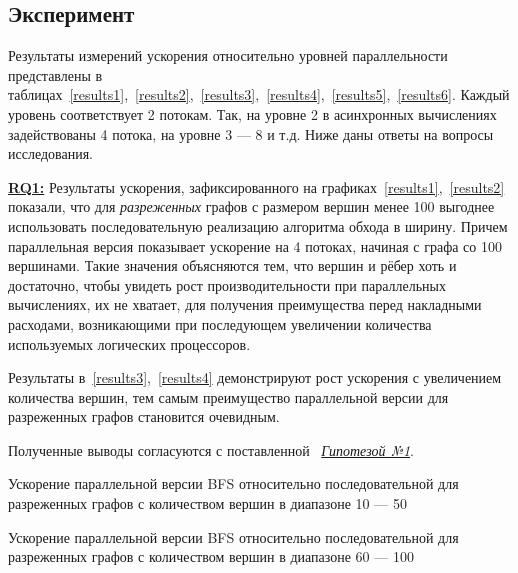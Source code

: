 \subsection{Эксперимент}
Результаты измерений ускорения относительно уровней параллельности представлены в таблицах~\ref{results1},~\ref{results2},~\ref{results3},~\ref{results4},~\ref{results5},~\ref{results6}. Каждый уровень соответствует 2 потокам. Так, на уровне 2 в асинхронных вычислениях задействованы 4 потока, на уровне 3 --- 8 и т.д. 
Ниже даны ответы на вопросы исследования.
\newline

\hyperref[rq1]{\textbf{RQ1:}}
Результаты ускорения, зафиксированного на графиках~\ref{results1},~\ref{results2} показали, что для \emph{разреженных} графов с размером вершин менее 100 выгоднее использовать последовательную реализацию алгоритма обхода в ширину. Причем параллельная версия показывает ускорение на 4 потоках, начиная с графа со 100 вершинами. Такие значения объясняются тем, что вершин и рёбер хоть и достаточно, чтобы увидеть рост производительности при параллельных вычислениях, их не хватает, для получения преимущества перед накладными расходами, возникающими при последующем увеличении количества используемых логических процессоров. 

Результаты в~\ref{results3},~\ref{results4} демонстрируют рост ускорения с увеличением количества вершин, тем самым преимущество параллельной версии для разреженных графов становится очевидным.

Полученные выводы согласуются с поставленной ~\hyperref[t1]{\textit{Гипотезой №1}}.
\newline

\begin{table}
  \centering

\caption{Ускорение параллельной версии BFS относительно последовательной для разреженных графов с количеством вершин в диапазоне 10 --- 50}
\label{results1}
\end{table}

\begin{table}
  \centering

\caption{Ускорение параллельной версии BFS относительно последовательной для разреженных графов с количеством вершин в диапазоне 60 --- 100}
\label{results2}
\end{table}

